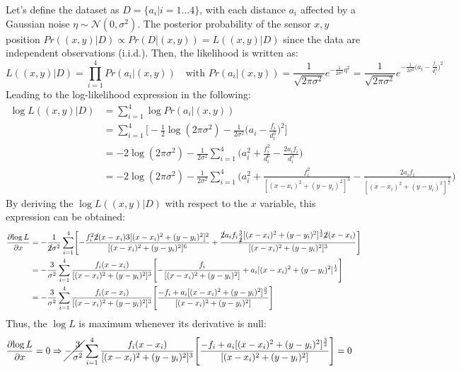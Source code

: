\Answer[number={3}]
Let's define the dataset as \(D=\{a_i | i=1...4\}\),
with each distance \(a_i\) affected by a Gaussian
noise \(\eta\sim\mathcal{N}(0,\sigma^2)\).
The posterior probability of the sensor \(x,y\) position
\(Pr((x,y)|D)\propto Pr(D|(x,y)) = L((x,y)|D)\) since the data are
independent observations (i.i.d.).
Then, the likelihood is written as:
\[
    L((x,y)|D) = \prod_{i=1}^{4} Pr(a_i|(x,y))
    \quad
    \text{with }
    Pr(a_i|(x,y))
    =
    \frac{1}{\sqrt{2\pi\sigma^2}}e^{-\frac{1}{2\sigma^2}\eta^2} =
    \frac{1}{\sqrt{2\pi\sigma^2}}e^{-\frac{1}{2\sigma^2}\bigl(a_i-\frac{f_i}{d_i^3}\bigr)^2}
\]
Leading to the log-likelihood expression in the following:
\begin{align*}
    \log{L}((x,y)|D)
    &=
    \sum_{i=1}^{4} \log{Pr(a_i|(x,y))} \\
    &=
    \sum_{i=1}^{4} \biggl[-\frac{1}{2}\log{(2\pi\sigma^2)} -\frac{1}{2\sigma^2}\biggl(a_i-\frac{f_i}{d_i^3}\biggr)^2\biggr] \\
    &=
    -2\log{(2\pi\sigma^2)} -\frac{1}{2\sigma^2}\sum_{i=1}^{4} \biggl(a_i^2 + \frac{f_i^2}{d_i^6} -\frac{2a_i f_i}{d_i^3}\biggr) \\
    &=
    -2\log{(2\pi\sigma^2)} -\frac{1}{2\sigma^2}\sum_{i=1}^{4} \biggl(a_i^2 + \frac{f_i^2}{[(x-x_i)^2+(y-y_i)^2]^3} -\frac{2a_i f_i}{[(x-x_i)^2+(y-y_i)^2]^\frac{3}{2}}\biggr)
\end{align*}
By deriving the \(\log{L}((x,y)|D)\) with respect to the \(x\) variable,
this expression can be obtained:
\begin{align*}
    \frac{\partial{\log{L}}}{\partial{x}}
    &=
    -\frac{1}{\cancel{2}\sigma^2}\sum_{i=1}^{4} \Biggl[-\frac{f_i^2 \cancel{2}(x-x_i)3[(x-x_i)^2+(y-y_i)^2]^2}{[(x-x_i)^2+(y-y_i)^2]^6} + \frac{\cancel{2}a_i f_i\frac{3}{\cancel{2}}[(x-x_i)^2+(y-y_i)^2]^\frac{1}{2}\cancel{2}(x-x_i)}{[(x-x_i)^2+(y-y_i)^2]^3}\Biggr] \\
    &=
    -\frac{3}{\sigma^2}\sum_{i=1}^{4} \frac{f_i (x-x_i)}{[(x-x_i)^2+(y-y_i)^2]^3} \Biggl[-\frac{f_i}{[(x-x_i)^2+(y-y_i)^2]} + a_i[(x-x_i)^2+(y-y_i)^2]^\frac{1}{2}\Biggr] \\
    &=
    -\frac{3}{\sigma^2}\sum_{i=1}^{4} \frac{f_i (x-x_i)}{[(x-x_i)^2+(y-y_i)^2]^3} \Biggl[\frac{-f_i + a_i[(x-x_i)^2+(y-y_i)^2]^\frac{3}{2}}{[(x-x_i)^2+(y-y_i)^2]}\Biggr]
\end{align*}
Thus, the \(\log{L}\) is maximum whenever its derivative is null:
\begin{align*}
    \frac{\partial{\log{L}}}{\partial{x}}
    =
    0
    &\Rightarrow
    \cancel{-\frac{3}{\sigma^2}}\sum_{i=1}^{4} \frac{f_i (x-x_i)}{[(x-x_i)^2+(y-y_i)^2]^3} \Biggl[\frac{-f_i + a_i[(x-x_i)^2+(y-y_i)^2]^\frac{3}{2}}{[(x-x_i)^2+(y-y_i)^2]}\Biggr]
    =
    0
\end{align*}
